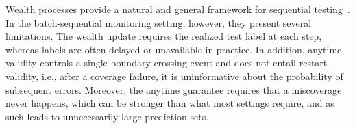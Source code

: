\documentclass{uai2026} %
\newcommand{\1}{\mathbf{1}}
\newcommand{\mcal}{\mathcal{M}}
\begin{document}
Wealth processes provide a natural and general framework for sequential testing~\citep{shafer2011test,ramdas2023game}. In the batch-sequential monitoring setting, however, they present several limitations. The wealth update requires the realized test label at each step, whereas labels are often delayed or unavailable in practice. In addition, anytime-validity controls a single boundary-crossing event and does not entail restart validity, i.e., after a coverage failure, it is uninformative about the probability of subsequent errors. Moreover, the anytime guarantee requires that a miscoverage never happens, which can be stronger than what most settings require, and as such leads to unnecessarily large prediction sets.


\end{document}
